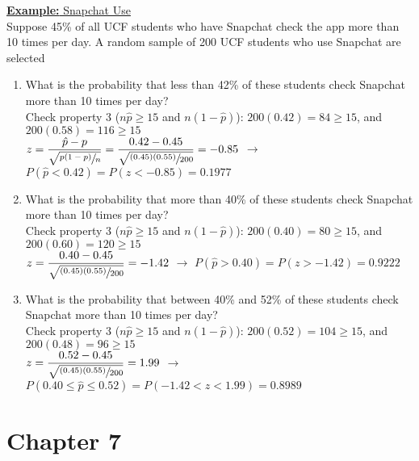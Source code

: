 \documentclass[a4paper]{article}
\let\bf\textbf
\begin{document}
\newpage
\begin{shaded}
    \underline{\bf{Example:} Snapchat Use}
    \vspace{2mm}\\
    Suppose 45\% of all UCF students who have Snapchat check the app more than 10 times per day. A random sample of 200 UCF students who use Snapchat are selected
    \begin{enumerate}
        \item What is the probability that less than 42\% of these students check Snapchat more than 10 times per day?\\
        Check property 3 ($n\hat{p} \geq 15$ and $n(1 - \hat{p})$): $200(0.42) = 84 \geq 15$, and $200(0.58) = 116 \geq 15$\\
        $\displaystyle z = \frac{\hat{p} - p}{\sqrt{\sfrac{p(1 - p)}{n}}} = \frac{0.42 - 0.45}{\sqrt{\sfrac{(0.45)(0.55)}{200}}} = -0.85$ \hspace{2mm}$\to$\hspace{2mm} $P(\hat{p} < 0.42) = P(z < -0.85) = 0.1977$
        \item What is the probability that more than 40\% of these students check Snapchat more than 10 times per day?\\
        Check property 3 ($n\hat{p} \geq 15$ and $n(1 - \hat{p})$): $200(0.40) = 80 \geq 15$, and $200(0.60) = 120 \geq 15$\\
        $\displaystyle z = \frac{0.40 - 0.45}{\sqrt{\sfrac{(0.45)(0.55)}{200}}} = -1.42$ \hspace{2mm}$\to$\hspace{2mm} $P(\hat{p} > 0.40) = P(z > -1.42) = 0.9222$
        \item What is the probability that between 40\% and 52\% of these students check Snapchat more than 10 times per day?\\
        Check property 3 ($n\hat{p} \geq 15$ and $n(1 - \hat{p})$): $200(0.52) = 104 \geq 15$, and $200(0.48) = 96 \geq 15$\\
        $\displaystyle z = \frac{0.52 - 0.45}{\sqrt{\sfrac{(0.45)(0.55)}{200}}} = 1.99$ \hspace{2mm}$\to$\hspace{2mm} $P(0.40 \leq \hat{p} \leq 0.52) = P(-1.42 < z < 1.99) = 0.8989$
    \end{enumerate}
\end{shaded}

\section{Chapter 7}
\end{document}

